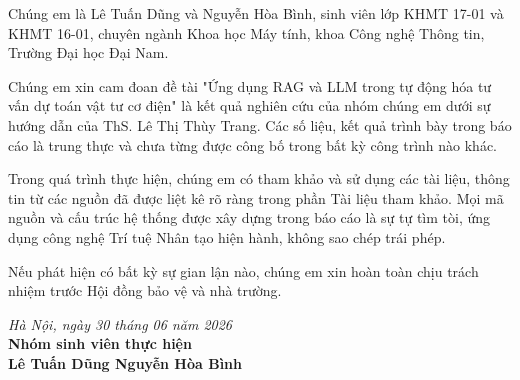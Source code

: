 
Chúng em là Lê Tuấn Dũng và Nguyễn Hòa Bình, sinh viên lớp KHMT 17-01 và KHMT 16-01, chuyên ngành Khoa học Máy tính, khoa Công nghệ Thông tin, Trường Đại học Đại Nam.

Chúng em xin cam đoan đề tài "Ứng dụng RAG và LLM trong tự động hóa tư vấn dự toán vật tư cơ điện" là kết quả nghiên cứu của nhóm chúng em dưới sự hướng dẫn của ThS. Lê Thị Thùy Trang. Các số liệu, kết quả trình bày trong báo cáo là trung thực và chưa từng được công bố trong bất kỳ công trình nào khác. 

Trong quá trình thực hiện, chúng em có tham khảo và sử dụng các tài liệu, thông tin từ các nguồn đã được liệt kê rõ ràng trong phần Tài liệu tham khảo. Mọi mã nguồn và cấu trúc hệ thống được xây dựng trong báo cáo là sự tự tìm tòi, ứng dụng công nghệ Trí tuệ Nhân tạo hiện hành, không sao chép trái phép.

Nếu phát hiện có bất kỳ sự gian lận nào, chúng em xin hoàn toàn chịu trách nhiệm trước Hội đồng bảo vệ và nhà trường.

\vspace{1cm}
\begin{flushright}
\textit{Hà Nội, ngày 30 tháng 06 năm 2026} \\
\textbf{Nhóm sinh viên thực hiện} \\[1.5cm]
\textbf{Lê Tuấn Dũng \hspace{1cm} Nguyễn Hòa Bình}
\end{flushright}
